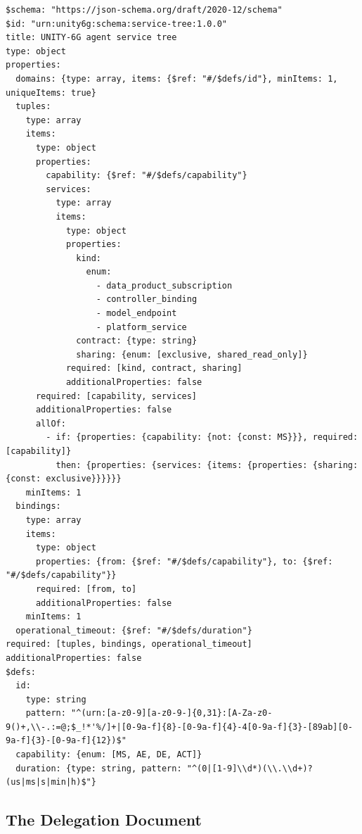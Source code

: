\begin{verbatim}
$schema: "https://json-schema.org/draft/2020-12/schema"
$id: "urn:unity6g:schema:service-tree:1.0.0"
title: UNITY-6G agent service tree
type: object
properties:
  domains: {type: array, items: {$ref: "#/$defs/id"}, minItems: 1, uniqueItems: true}
  tuples:
    type: array
    items:
      type: object
      properties:
        capability: {$ref: "#/$defs/capability"}
        services:
          type: array
          items:
            type: object
            properties:
              kind:
                enum:
                  - data_product_subscription
                  - controller_binding
                  - model_endpoint
                  - platform_service
              contract: {type: string}
              sharing: {enum: [exclusive, shared_read_only]}
            required: [kind, contract, sharing]
            additionalProperties: false
      required: [capability, services]
      additionalProperties: false
      allOf:
        - if: {properties: {capability: {not: {const: MS}}}, required: [capability]}
          then: {properties: {services: {items: {properties: {sharing: {const: exclusive}}}}}}
    minItems: 1
  bindings:
    type: array
    items:
      type: object
      properties: {from: {$ref: "#/$defs/capability"}, to: {$ref: "#/$defs/capability"}}
      required: [from, to]
      additionalProperties: false
    minItems: 1
  operational_timeout: {$ref: "#/$defs/duration"}
required: [tuples, bindings, operational_timeout]
additionalProperties: false
$defs:
  id:
    type: string
    pattern: "^(urn:[a-z0-9][a-z0-9-]{0,31}:[A-Za-z0-9()+,\\-.:=@;$_!*'%/]+|[0-9a-f]{8}-[0-9a-f]{4}-4[0-9a-f]{3}-[89ab][0-9a-f]{3}-[0-9a-f]{12})$"
  capability: {enum: [MS, AE, DE, ACT]}
  duration: {type: string, pattern: "^(0|[1-9]\\d*)(\\.\\d+)?(us|ms|s|min|h)$"}
\end{verbatim}

\hypertarget{a.4-the-delegation-document}{%
\subsection{The Delegation Document}\label{a.4-the-delegation-document}}

